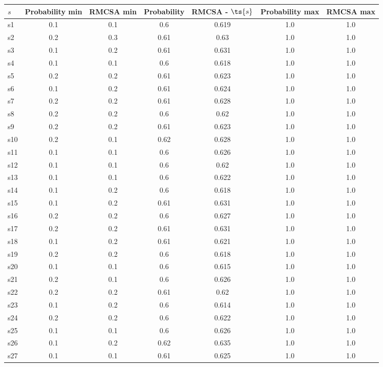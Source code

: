 \documentclass{article}
\begin{document}
\noindent\begin{tabular}{|l|c|c|c|c|c|c|}
\hline
$s$& Probability min & RMCSA min & Probability & RMCSA - $\ts{s}$ & Probability max & RMCSA max\\
\hline
s1 &0.1 & 0.1 & 0.6 & 0.619 & 1.0 & 1.0\\
\hline
s2 &0.2 & 0.3 & 0.61 & 0.63 & 1.0 & 1.0\\
\hline
s3 &0.1 & 0.2 & 0.61 & 0.631 & 1.0 & 1.0\\
\hline
s4 &0.1 & 0.1 & 0.6 & 0.618 & 1.0 & 1.0\\
\hline
s5 &0.2 & 0.2 & 0.61 & 0.623 & 1.0 & 1.0\\
\hline
s6 &0.1 & 0.2 & 0.61 & 0.624 & 1.0 & 1.0\\
\hline
s7 &0.2 & 0.2 & 0.61 & 0.628 & 1.0 & 1.0\\
\hline
s8 &0.2 & 0.2 & 0.6 & 0.62 & 1.0 & 1.0\\
\hline
s9 &0.2 & 0.2 & 0.61 & 0.623 & 1.0 & 1.0\\
\hline
s10 &0.2 & 0.1 & 0.62 & 0.628 & 1.0 & 1.0\\
\hline
s11 &0.1 & 0.1 & 0.6 & 0.626 & 1.0 & 1.0\\
\hline
s12 &0.1 & 0.1 & 0.6 & 0.62 & 1.0 & 1.0\\
\hline
s13 &0.1 & 0.1 & 0.6 & 0.622 & 1.0 & 1.0\\
\hline
s14 &0.1 & 0.2 & 0.6 & 0.618 & 1.0 & 1.0\\
\hline
s15 &0.1 & 0.2 & 0.61 & 0.631 & 1.0 & 1.0\\
\hline
s16 &0.2 & 0.2 & 0.6 & 0.627 & 1.0 & 1.0\\
\hline
s17 &0.2 & 0.2 & 0.61 & 0.631 & 1.0 & 1.0\\
\hline
s18 &0.1 & 0.2 & 0.61 & 0.621 & 1.0 & 1.0\\
\hline
s19 &0.2 & 0.2 & 0.6 & 0.618 & 1.0 & 1.0\\
\hline
s20 &0.1 & 0.1 & 0.6 & 0.615 & 1.0 & 1.0\\
\hline
s21 &0.2 & 0.1 & 0.6 & 0.626 & 1.0 & 1.0\\
\hline
s22 &0.2 & 0.2 & 0.61 & 0.62 & 1.0 & 1.0\\
\hline
s23 &0.1 & 0.2 & 0.6 & 0.614 & 1.0 & 1.0\\
\hline
s24 &0.2 & 0.2 & 0.6 & 0.622 & 1.0 & 1.0\\
\hline
s25 &0.1 & 0.1 & 0.6 & 0.626 & 1.0 & 1.0\\
\hline
s26 &0.1 & 0.2 & 0.62 & 0.635 & 1.0 & 1.0\\
\hline
s27 &0.1 & 0.1 & 0.61 & 0.625 & 1.0 & 1.0\\

\end{tabular}
\end{document}
